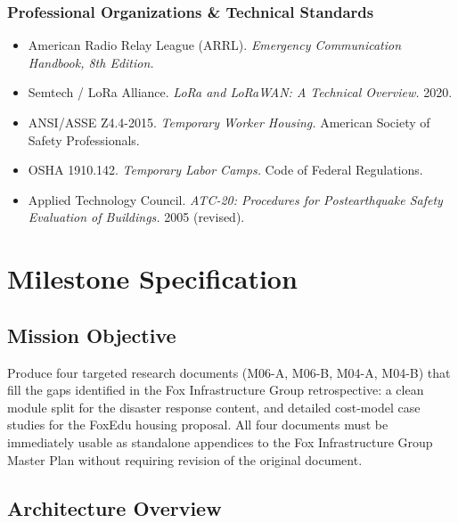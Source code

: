 \documentclass[11pt,letterpaper]{article}
\newcommand{\stageheader}[2]{%
  \noindent\colorbox{#2}{\makebox[\textwidth][l]{%
    \textcolor{white}{\bfseries\sffamily\hspace{6pt}#1\hspace{6pt}}}}%
  \vspace{0.5em}\par%
}
\begin{document}
\subsubsection{Professional Organizations \& Technical Standards}
\begin{itemize}[leftmargin=1.5em]
  \item American Radio Relay League (ARRL). \textit{Emergency Communication Handbook, 8th Edition.}
  \item Semtech / LoRa Alliance. \textit{LoRa and LoRaWAN: A Technical Overview.} 2020.
  \item ANSI/ASSE Z4.4-2015. \textit{Temporary Worker Housing.} American Society of Safety Professionals.
  \item OSHA 1910.142. \textit{Temporary Labor Camps.} Code of Federal Regulations.
  \item Applied Technology Council. \textit{ATC-20: Procedures for Postearthquake Safety Evaluation of Buildings.} 2005 (revised).
\end{itemize}

\newpage
\stageheader{STAGE 3 --- MISSION PACKAGE}{tertiary}

\section{Milestone Specification}

\subsection{Mission Objective}

Produce four targeted research documents (M06-A, M06-B, M04-A, M04-B) that fill the gaps identified in the Fox Infrastructure Group retrospective: a clean module split for the disaster response content, and detailed cost-model case studies for the FoxEdu housing proposal. All four documents must be immediately usable as standalone appendices to the Fox Infrastructure Group Master Plan without requiring revision of the original document.

\subsection{Architecture Overview}
\end{document}
